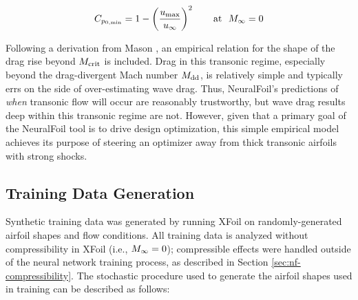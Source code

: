     \begin{equation}
        C_{p_{0,\rm min}} = 1 - \left( \frac{u_{\rm max}}{u_\infty} \right)^2 \qquad \text{at }\ M_\infty = 0
    \end{equation}

    Following a derivation from Mason \cite{mason_transonic_2006}, an empirical relation for the shape of the drag rise beyond $M_{\rm crit}$ is included. Drag in this transonic regime, especially beyond the drag-divergent Mach number $M_{\rm dd}$, is relatively simple and typically errs on the side of over-estimating wave drag. Thus, NeuralFoil's predictions of \textit{when} transonic flow will occur are reasonably trustworthy, but wave drag results deep within this transonic regime are not. However, given that a primary goal of the NeuralFoil tool is to drive design optimization, this simple empirical model achieves its purpose of steering an optimizer away from thick transonic airfoils with strong shocks.

    \subsection{Training Data Generation}
    \label{sec:nf-training-data}

    Synthetic training data was generated by running XFoil on randomly-generated airfoil shapes and flow conditions. All training data is analyzed without compressibility in XFoil (i.e., $M_\infty=0$); compressible effects were handled outside of the neural network training process, as described in Section \ref{sec:nf-compressibility}. The stochastic procedure used to generate the airfoil shapes used in training can be described as follows:

